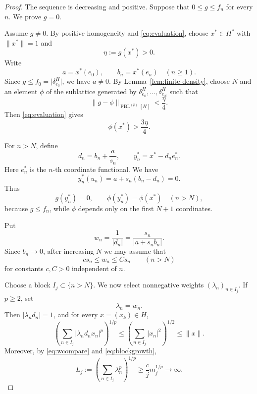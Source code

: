 \documentclass[11pt]{article}
\theoremstyle{remark}
\newcommand{\FBL}[2]{\operatorname{FBL}^{(#1)}[#2]}
\newcommand{\abs}[1]{\lvert #1\rvert}
\newcommand{\norm}[1]{\lVert #1\rVert}
\begin{document}
\begin{proof}
The sequence is decreasing and positive.  Suppose that
\(0\le g\le f_n\) for every \(n\).  We prove \(g=0\).

Assume \(g\ne0\).  By positive homogeneity and
\eqref{eq:evaluation}, choose \(x^*\in H^*\) with
\(\norm{x^*}=1\) and
\[
  \eta:=g(x^*)>0.
\]
Write
\[
  a=x^*(e_0),\qquad b_n=x^*(e_n)\quad(n\ge1).
\]
Since \(g\le f_0=\abs{\delta_{e_0}^H}\), we have \(a\ne0\).
By Lemma~\ref{lem:finite-density}, choose \(N\) and an element \(\phi\)
of the sublattice generated by
\(\delta_{e_0}^H,\ldots,\delta_{e_N}^H\) such that
\begin{equation}\label{eq:approxphi}
  \norm{g-\phi}_{\FBL{p}{H}}<\frac{\eta}{4}.
\end{equation}
Then \eqref{eq:evaluation} gives
\begin{equation}\label{eq:phipos}
  \phi(x^*)>\frac{3\eta}{4}.
\end{equation}

For \(n>N\), define
\[
  d_n=b_n+\frac{a}{s_n},
  \qquad
  y_n^*=x^*-d_ne_n^*.
\]
Here \(e_n^*\) is the \(n\)-th coordinate functional.  We have
\[
  y_n^*(u_n)=a+s_n(b_n-d_n)=0.
\]
Thus
\begin{equation}\label{eq:gyzero}
  g(y_n^*)=0,
  \qquad
  \phi(y_n^*)=\phi(x^*)
  \quad(n>N),
\end{equation}
because \(g\le f_n\), while \(\phi\) depends only on the first
\(N+1\) coordinates.

Put
\[
  w_n=\frac1{\abs{d_n}}
      =\frac{s_n}{\abs{a+s_nb_n}}.
\]
Since \(b_n\to0\), after increasing \(N\) we may assume that
\begin{equation}\label{eq:wcompare}
  c s_n\le w_n\le C s_n \qquad(n>N)
\end{equation}
for constants \(c,C>0\) independent of \(n\).

Choose a block \(I_j\subset\{n>N\}\).  We now select nonnegative weights
\((\lambda_n)_{n\in I_j}\).  If \(p\ge2\), set
\[
  \lambda_n=w_n.
\]
Then \(\abs{\lambda_nd_n}=1\), and for every \(x=(x_k)\in H\),
\begin{equation}\label{eq:diaglargep}
  \left(\sum_{n\in I_j}\abs{\lambda_nd_nx_n}^p\right)^{1/p}
  \le \left(\sum_{n\in I_j}\abs{x_n}^2\right)^{1/2}
  \le\norm{x}.
\end{equation}
Moreover, by \eqref{eq:wcompare} and \eqref{eq:blockgrowth},
\[
  L_j:=\left(\sum_{n\in I_j}\lambda_n^p\right)^{1/p}
  \ge \frac{c}{j}m_j^{1/p}\longrightarrow\infty.
\]


\end{proof}
\end{document}
